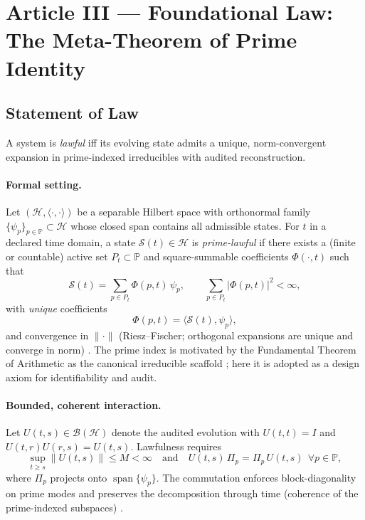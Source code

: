 \documentclass[12pt]{amsart}
\theoremstyle{plain}
\begin{document}
\section{Article III — Foundational Law: The Meta-Theorem of Prime Identity}

\subsection{Statement of Law}

A system is \emph{lawful} iff its evolving state admits a unique, norm-convergent expansion in prime-indexed irreducibles with audited reconstruction.

\paragraph{Formal setting.}
Let $(\mathcal{H},\langle\cdot,\cdot\rangle)$ be a separable Hilbert space with orthonormal family $\{\psi_p\}_{p\in\mathbb{P}}\subset\mathcal{H}$ whose closed span contains all admissible states. For $t$ in a declared time domain, a state $\mathcal{S}(t)\in\mathcal{H}$ is \emph{prime-lawful} if there exists a (finite or countable) active set $P_t\subset\mathbb{P}$ and square-summable coefficients $\Phi(\cdot,t)$ such that
\[
\mathcal{S}(t)=\sum_{p\in P_t}\Phi(p,t)\,\psi_p,
\qquad
\sum_{p\in P_t}|\Phi(p,t)|^2<\infty,
\]
with \emph{unique} coefficients
\[
\Phi(p,t)=\langle \mathcal{S}(t),\psi_p\rangle,
\]
and convergence in $\|\cdot\|$ (Riesz–Fischer; orthogonal expansions are unique and converge in norm) \cite[Ch.\,3]{rudin1991functional,conway1990functional}. The prime index is motivated by the Fundamental Theorem of Arithmetic as the canonical irreducible scaffold \cite[Ch.\,1–2]{hardy2008introduction}; here it is adopted as a design axiom for identifiability and audit.

\paragraph{Bounded, coherent interaction.}
Let $U(t,s)\in\mathcal{B}(\mathcal{H})$ denote the audited evolution with $U(t,t)=I$ and $U(t,r)U(r,s)=U(t,s)$. Lawfulness requires
\[
\sup_{t\ge s}\|U(t,s)\|\le M<\infty
\quad\text{and}\quad
U(t,s)\,\Pi_p=\Pi_p\,U(t,s)\ \ \forall p\in\mathbb{P},
\]
where $\Pi_p$ projects onto $\operatorname{span}\{\psi_p\}$. The commutation enforces block-diagonality on prime modes and preserves the decomposition through time (coherence of the prime-indexed subspaces) \cite[Ch.\,1]{lax2002functional}.
\end{document}
